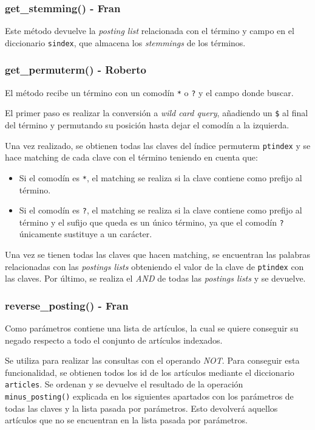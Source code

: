 \documentclass[12pt,a4paper]{article}
\begin{document}
\subsubsection{get\_stemming() - Fran}
Este método devuelve la \textit{posting list} relacionada con el término y campo en el diccionario \texttt{sindex}, que almacena los \textit{stemmings} de los términos.

\subsubsection{get\_permuterm() - Roberto}
El método recibe un término con un comodín \texttt{*} o \texttt{?} y el campo donde buscar.

El primer paso es realizar la conversión a \textit{wild card query}, añadiendo un \texttt{\$} al final del término y permutando su posición hasta dejar el comodín a la izquierda.

Una vez realizado, se obtienen todas las claves del índice permuterm \texttt{ptindex} y se hace matching de cada clave con el término teniendo en cuenta que:
\begin{itemize}
  \item Si el comodín es \texttt{*}, el matching se realiza si la clave contiene como prefijo al término.
  \item Si el comodín es \texttt{?}, el matching se realiza si la clave contiene como prefijo al término y el sufijo que queda es un único término, ya que el comodín \texttt{?} únicamente sustituye a un carácter.
\end{itemize}

Una vez se tienen todas las claves que hacen matching, se encuentran las palabras relacionadas con las \textit{postings lists} obteniendo el valor de la clave de \texttt{ptindex} con las claves. Por último, se realiza el \textit{AND} de todas las \textit{postings lists} y se devuelve.

\subsubsection{reverse\_posting() - Fran}
Como parámetros contiene una lista de artículos, la cual se quiere conseguir su negado respecto a todo el conjunto de artículos indexados.

Se utiliza para realizar las consultas con el operando \textit{NOT}. Para conseguir esta funcionalidad, se obtienen todos los id de los artículos mediante el diccionario \texttt{articles}. Se ordenan y se devuelve el resultado de la operación \texttt{minus\_posting()} explicada en los siguientes apartados con los parámetros de todas las claves y la lista pasada por parámetros. Esto devolverá aquellos artículos que no se encuentran en la lista pasada por parámetros.
\end{document}
